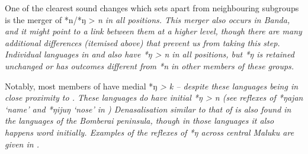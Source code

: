 One of the clearest sound changes which sets 
apart from neighbouring subgroups is the merger of *n/*ŋ > \it{n} in all positions.
This merger also occurs in Banda,
and it might point to a link between them at a higher level,
though there are many additional differences (itemised above)
that prevent us from taking this step.
Individual languages in 
and  also have *ŋ > \it{n} in all
positions, but *ŋ is retained unchanged or has outcomes different from *n
in other members of these groups.

Notably, most members of  have medial *ŋ \it{>
k} -- despite these languages being in close proximity to .
These languages do have initial *ŋ > \it{n} (see reflexes of
*ŋajan ‘name’ and *ŋijuŋ ‘nose’ in ) Denasalisation similar to that
of  is also found in the languages of the Bomberai
peninsula, though in those languages it also happens word initially.
Examples of the reflexes of *ŋ across central Maluku are given in .

